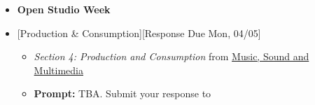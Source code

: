 \def\dMon{Mon, 04/05}
\def\dTues{Tues, 04/06}
\def\dWed{Wed, 04/07}
\def\dThur{Thur, 04/08}
\def\dFri{Fri, 04/09}
\def\dSat{Sat, 04/10}
\def\dSun{Sun, 04/11}
\placeDate

\begin{itemize}[noitemsep,topsep=0pt,leftmargin=*]
	\item \textcolor{defaultColor}{\textbf{Open Studio Week}}
	\item {}[Production \& Consumption][Response Due \dMon]
	      \begin{itemize}
		      \item \emph{Section 4: Production and Consumption} from \href{supplements/Music_Sound_and_Multimedia_-_From_the_Live_to_the_Virtual_(Music_and_the_Moving_Image)_(2008).pdf}{Music, Sound and Multimedia}
		      \item \textbf{Prompt:} TBA. Submit your response to \discordR
	      \end{itemize}
\end{itemize}